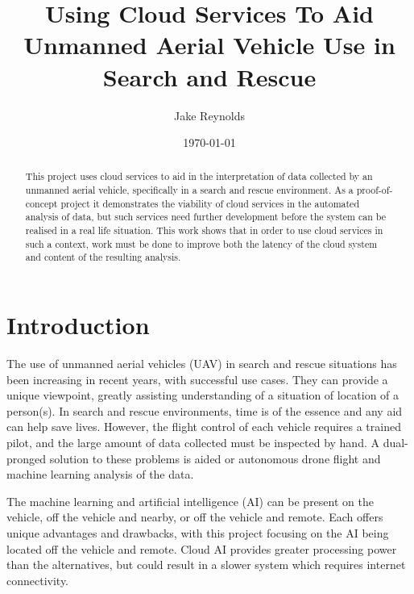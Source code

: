 \documentclass{article}
\begin{document}
\begin{titlingpage}

\title{Using Cloud Services To Aid Unmanned Aerial Vehicle Use in Search and Rescue}
\author{Jake Reynolds}
\date{\today}
\maketitle

\vspace*{\fill}

\begin{abstract}
\begin{large}
This project uses cloud services to aid in the interpretation of data collected by an unmanned aerial vehicle, specifically in a search and rescue environment. As a proof-of-concept project it demonstrates the viability of cloud services in the automated analysis of data, but such services need further development before the system can be realised in a real life situation. This work shows that in order to use cloud services in such a context, work must be done to improve both the latency of the cloud system and content of the resulting analysis.
\end{large}
\end{abstract}
\vspace*{\fill}
\end{titlingpage}

\tableofcontents


\section{Introduction}
The use of unmanned aerial vehicles (UAV) in search and rescue situations has been increasing in recent years, with successful use cases. They can provide a unique viewpoint, greatly assisting understanding of a situation of location of a person(s). In search and rescue environments, time is of the essence and any aid can help save lives. However, the flight control of each vehicle requires a trained pilot, and the large amount of data collected must be inspected by hand. A dual-pronged solution to these problems is aided or autonomous drone flight and machine learning analysis of the data.

The machine learning and artificial intelligence (AI) can be present on the vehicle, off the vehicle and nearby, or off the vehicle and remote. Each offers unique advantages and drawbacks, with this project focusing on the AI being located off the vehicle and remote. Cloud AI provides greater processing power than the alternatives, but could result in a slower system which requires internet connectivity. 
\end{document}
